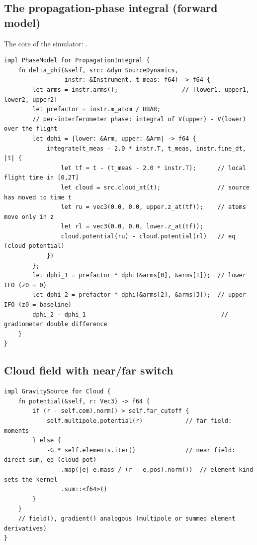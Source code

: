 \documentclass[11pt,a4paper]{article}
\theoremstyle{reqstyle}
\begin{document}
\subsection{The propagation-phase integral (forward model)}
The core of the simulator: .
\begin{lstlisting}
impl PhaseModel for PropagationIntegral {
    fn delta_phi(&self, src: &dyn SourceDynamics,
                 instr: &Instrument, t_meas: f64) -> f64 {
        let arms = instr.arms();                  // [lower1, upper1, lower2, upper2]
        let prefactor = instr.m_atom / HBAR;
        // per-interferometer phase: integral of V(upper) - V(lower) over the flight
        let dphi = |lower: &Arm, upper: &Arm| -> f64 {
            integrate(t_meas - 2.0 * instr.T, t_meas, instr.fine_dt, |t| {
                let tf = t - (t_meas - 2.0 * instr.T);      // local flight time in [0,2T]
                let cloud = src.cloud_at(t);                // source has moved to time t
                let ru = vec3(0.0, 0.0, upper.z_at(tf));    // atoms move only in z
                let rl = vec3(0.0, 0.0, lower.z_at(tf));
                cloud.potential(ru) - cloud.potential(rl)   // eq (cloud potential)
            })
        };
        let dphi_1 = prefactor * dphi(&arms[0], &arms[1]);  // lower IFO (z0 = 0)
        let dphi_2 = prefactor * dphi(&arms[2], &arms[3]);  // upper IFO (z0 = baseline)
        dphi_2 - dphi_1                                      // gradiometer double difference
    }
}
\end{lstlisting}

\subsection{Cloud field with near/far switch}
\begin{lstlisting}
impl GravitySource for Cloud {
    fn potential(&self, r: Vec3) -> f64 {
        if (r - self.com).norm() > self.far_cutoff {
            self.multipole.potential(r)            // far field: moments
        } else {
            -G * self.elements.iter()              // near field: direct sum, eq (cloud pot)
                .map(|e| e.mass / (r - e.pos).norm())  // element kind sets the kernel
                .sum::<f64>()
        }
    }
    // field(), gradient() analogous (multipole or summed element derivatives)
}
\end{lstlisting}
\end{document}
